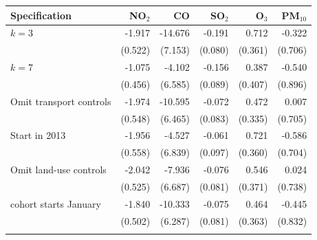 \begin{tabular}{lrrrrr}
\toprule
Specification & NO$_2$ & CO & SO$_2$ & O$_3$ & PM$_{10}$ \\
\midrule
$k=3$ & -1.917 & -14.676 & -0.191 & 0.712 & -0.322 \\
 & (0.522) & (7.153) & (0.080) & (0.361) & (0.706) \\
\addlinespace[3pt]
$k=7$ & -1.075 & -4.102 & -0.156 & 0.387 & -0.540 \\
 & (0.456) & (6.585) & (0.089) & (0.407) & (0.896) \\
\addlinespace[3pt]
Omit transport controls & -1.974 & -10.595 & -0.072 & 0.472 & 0.007 \\
 & (0.548) & (6.465) & (0.083) & (0.335) & (0.705) \\
\addlinespace[3pt]
Start in 2013 & -1.956 & -4.527 & -0.061 & 0.721 & -0.586 \\
 & (0.558) & (6.839) & (0.097) & (0.360) & (0.704) \\
\addlinespace[3pt]
Omit land-use controls & -2.042 & -7.936 & -0.076 & 0.546 & 0.024 \\
 & (0.525) & (6.687) & (0.081) & (0.371) & (0.738) \\
\addlinespace[3pt]
2018 cohort starts January & -1.840 & -10.333 & -0.075 & 0.464 & -0.445 \\
 & (0.502) & (6.287) & (0.081) & (0.363) & (0.832) \\
\addlinespace[3pt]
\bottomrule
\end{tabular}
